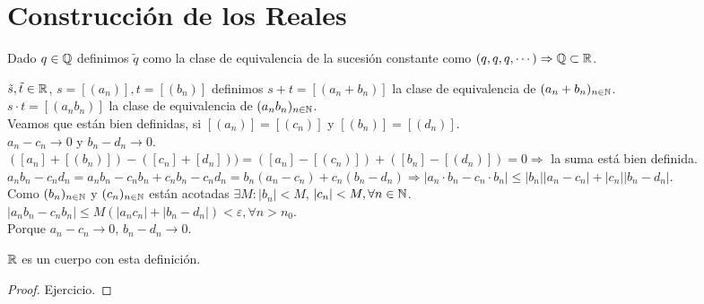 \section{Construcción de los Reales}

\begin{note}
  Dado $q \in \mathbb{Q}$ definimos $\tilde{q}$ como la clase de equivalencia de la sucesión constante como $(q, q, q, \cdots) \Rightarrow \mathbb{Q} \subset \mathbb{R}$.
\end{note}

\begin{definition}
  $\tilde{s}, \tilde{t} \in \mathbb{R}$, $s = [(a_n)], t = [(b_n)]$ definimos $s+t = [(a_n + b_n)]$ la clase de equivalencia de $(a_n + b_n)_{n \in \mathbb{N}}$. \\
  $s \cdot t = [(a_n b_n)]$ la clase de equivalencia de $(a_n b_n)_{n \in \mathbb{N}}$. \\
  Veamos que están bien definidas, si $[(a_n)] = [(c_n)]$ y $[(b_n)] = [(d_n)]$. \\
  $a_n - c_n \to 0$ y $b_n - d_n \to 0$. \\
  $([a_n] + [(b_n)]) - ([c_n] +[d_n])) = ([a_n] - [(c_n)]) + ([b_n] - [(d_n)]) = 0 \Rightarrow $ la suma está bien definida. \\
  $a_n b_n - c_n d_n = a_n b_n - c_n b_n + c_n b_n - c_n d_n = b_n (a_n - c_n) + c_n (b_n - d_n) \Rightarrow |a_n \cdot b_n - c_n \cdot b_n| \leq |b_n| |a_n - c_n| + |c_n| |b_n - d_n|$. \\
  Como $(b_n)_{n \in \mathbb{N}}$ y $(c_n)_{n \in \mathbb{N}}$ están acotadas $\exists M : |b_n| < M$, $|c_n| < M, \forall n \in \mathbb{N}$. \\
  $|a_n b_n - c_n b_n| \leq M (|a_n c_n| + |b_n - d_n|) < \varepsilon, \forall n > n_0$. \\
  Porque $a_n - c_n \to 0$, $b_n - d_n \to 0$.
\end{definition}

\begin{prop}
  $\mathbb{R}$ es un cuerpo con esta definición.
  \begin{proof}
    Ejercicio.
  \end{proof}
\end{prop}

